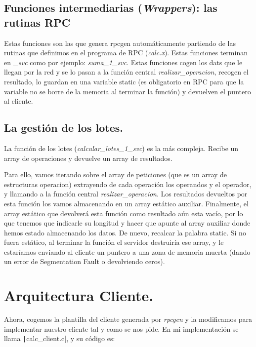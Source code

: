 \documentclass[a4paper,12pt]{article}
\begin{document}
	\subsection{Funciones intermediarias (\textit{Wrappers}): las rutinas RPC}
		Estas funciones son las que genera rpcgen automáticamente partiendo de las rutinas que definimos en el programa de RPC (\textit{calc.x}). Estas funciones terminan en \textit{\_svc} como por ejemplo: \textit{suma\_1\_svc}. 
		Estas funciones cogen los dats que le llegan por la red y se lo pasan a la función central \textit{realizar\_operacion}, recogen el resultado, lo guardan en una variable static (es obligatorio en RPC para que la variable no se borre de la memoria al terminar la función) y devuelven el puntero al cliente. 
			
	\subsection{La gestión de los lotes.}
		La función de los lotes (\textit{calcular\_lotes\_1\_svc}) es la más compleja. Recibe un array de operaciones y devuelve un array de resultados.
		
		Para ello, vamos iterando sobre el array de peticiones (que es un array de estructuras operacion) extrayendo de cada operación los operandos y el operador, y llamando a la función central \textit{realizar\_operacion}. Los resultados devueltos por esta función los vamos almacenando en un array  estático auxiliar. Finalmente, el array estático que devolverá esta función como resultado aún esta vacío, por lo que tenemos que indicarle su longitud y hacer que apunte al array auxiliar donde hemos estado almacenando los datos. De nuevo, recalcar la palabra static. Si no fuera estático, al terminar la función el servidor destruiría ese array, y le estaríamos enviando al cliente un puntero a una zona de memoria muerta (dando un error de Segmentation Fault o devolviendo ceros). 
		
\section{Arquitectura Cliente.}
	Ahora, cogemos la plantilla del cliente generada por \textit{rpcgen} y la modificamos para implementar nuestro cliente tal y como se nos pide. En mi implementación se llama
	\texttt|calc_client.c|, y su código es:
	
	\inputminted[linenos, frame=lines, fontsize=\footnotesize]{C}{../codigo/calc_client.c}
	
\end{document}
